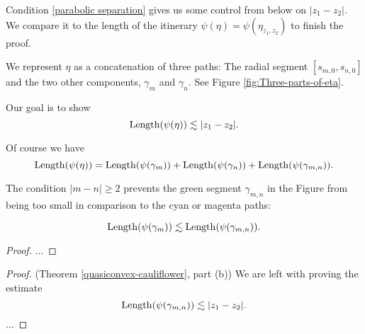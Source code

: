 Condition \ref{parabolic separation} gives us some control from below on $|z_1-z_2|$. We compare it to the length of the itinerary $\psi(\eta)=\psi(\eta_{z_1,z_2})$ to finish the proof.

 

We represent $\eta$ as a concatenation of three paths: The radial segment $[s_{m,0},s_{n,0}]$ and the two other components, $\gamma _m$ and $\gamma_n$. See Figure \ref{fig:Three-parts-of-eta}.

Our goal is to show 
\begin{equation} \label{quasiconvexity goal}
\operatorname{Length}(\psi(\eta)) \lesssim |z_1-z_2|.
\end{equation}


Of course we have
\begin{equation}
	\operatorname{Length}(\psi(\eta))=\operatorname{Length}(\psi(\gamma_m))+\operatorname{Length}(\psi(\gamma_n))+\operatorname{Length}(\psi(\gamma_{m,n})).
\end{equation}


The condition $|m-n| \geq 2$ prevents the green segment $\gamma _{m,n}$ in the Figure from being too small in comparison to the cyan or magenta paths:
\begin{proposition}
\begin{equation}
	\operatorname{Length}(\psi(\gamma_m)) \lesssim \operatorname{Length}(\psi(\gamma_{m,n})).
\end{equation}
\end{proposition}
\begin{proof}
...
\end{proof}


\begin{proof}(Theorem \ref{quasiconvex-cauliflower}, part (b))
	We are left with proving the estimate 
	\begin{equation}
		\operatorname{Length}(\psi(\gamma_{m,n})) \lesssim |z_1-z_2|.
	\end{equation}
	...
\end{proof}


